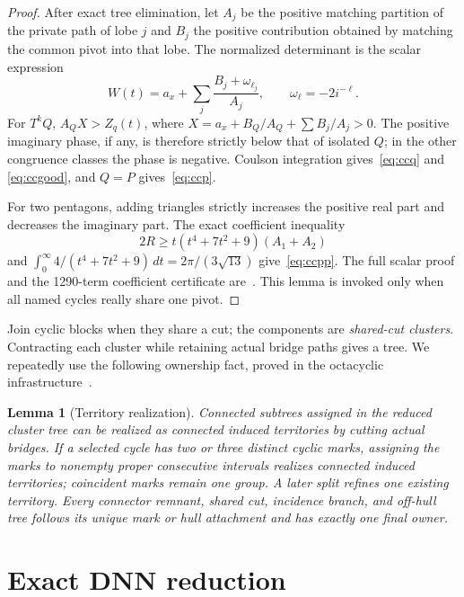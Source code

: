 \documentclass[11pt]{article}
\newtheorem{lemma}[theorem]{Lemma}
\begin{document}
\begin{proof}
After exact tree elimination, let $A_j$ be the positive matching partition of
the private path of lobe $j$ and $B_j$ the positive contribution obtained by
matching the common pivot into that lobe.  The normalized determinant is the
scalar expression
\[
 W(t)=a_x+\sum_j\frac{B_j+\omega_{\ell_j}}{A_j},
 \qquad \omega_\ell=-2i^{-\ell}.
\]
For $T^kQ$, $A_QX>Z_q(t)$, where
$X=a_x+B_Q/A_Q+\sum B_j/A_j>0$.  The positive imaginary phase, if any, is
therefore strictly below that of isolated $Q$; in the other congruence classes
the phase is negative.  Coulson integration gives~\eqref{eq:ccq} and
\eqref{eq:ccgood}, and $Q=P$ gives~\eqref{eq:ccp}.

For two pentagons, adding triangles strictly increases the positive real part
and decreases the imaginary part.  The exact coefficient inequality
\[
 2R\geq t(t^4+7t^2+9)(A_1+A_2)
\]
and
$\int_0^\infty4/(t^4+7t^2+9)\,dt=2\pi/(3\sqrt{13})$
give~\eqref{eq:ccpp}.  The full scalar proof and the 1290-term coefficient
certificate are~\cite{CommonCut,Coefficient}.  This lemma is invoked only when
all named cycles really share one pivot.
\end{proof}

Join cyclic blocks when they share a cut; the components are \emph{shared-cut
clusters}.  Contracting each cluster while retaining actual bridge paths gives
a tree.  We repeatedly use the following ownership fact, proved in the
octacyclic infrastructure~\cite[Lemmas~2.3--2.4]{Octacyclic}.

\begin{lemma}[Territory realization]\label{lem:ownership}
Connected subtrees assigned in the reduced cluster tree can be realized as
connected induced territories by cutting actual bridges.  If a selected cycle
has two or three distinct cyclic marks, assigning the marks to nonempty proper
consecutive intervals realizes connected induced territories; coincident marks
remain one group.  A later split refines one existing territory.  Every
connector remnant, shared cut, incidence branch, and off-hull tree follows its
unique mark or hull attachment and has exactly one final owner.
\end{lemma}

\section{Exact DNN reduction}
\end{document}
